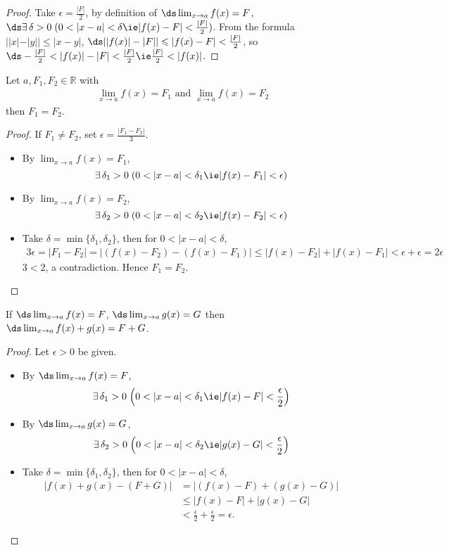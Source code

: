 \begin{proof}
  Take $\epsilon = \frac{|F|}{2}$, by definition of $\ds \lim_{x \to a} f(x) = F$, $\ds\exists\,\delta > 0\;(0 < |x - a| < \delta \ie  |f(x) - F| < \frac{|F|}{2})$. From the formula $||x| - |y|| \leqslant |x - y|$, $\ds||f(x)| - |F|| \leqslant |f(x) - F| < \frac{|F|}{2}$, so $\ds-\frac{|F|}{2} < |f(x)| - |F| < \frac{|F|}{2} \ie \frac{|F|}{2} < |f(x)|$.
\end{proof}
\begin{theorem}
  Let $a, F_1, F_2 \in \mathbb{R}$ with
  \begin{align*}
    \lim_{x \to a} f(x) = F_1 \text{ and }\lim_{x \to a} f(x) = F_2
  \end{align*}
  then $F_1 = F_2$.
\end{theorem}
\begin{proof}
  If $F_1\ne F_2$, set $\epsilon = \frac{|F_1 - F_2|}{3}$.
  \begin{itemize}
    \item By $\lim_{x\to a}f(x) = F_1$, $$\exists\,\delta_1 > 0\;(0 < |x - a| < \delta_1 \ie |f(x) - F_1| < \epsilon)$$
    \item By $\lim_{x\to a}f(x) = F_2$, $$\exists\,\delta_2 > 0\;(0 < |x - a| < \delta_2 \ie |f(x) - F_2| < \epsilon)$$
    \item Take $\delta = \min\{\delta_1, \delta_2\}$, then for $ 0 < |x - a| < \delta$,
      \begin{align*}
        3\epsilon = |F_1 - F_2| = |(f(x) - F_2) - (f(x) - F_1)| \leqslant |f(x) - F_2| + |f(x) - F_1| < \epsilon + \epsilon = 2\epsilon
      \end{align*}
      $3 < 2$, a contradiction. Hence $F_1 = F_2$.
  \end{itemize}
\end{proof}
\begin{theorem}
  If $\ds\lim_{x\to a}f(x) = F$, $\ds\lim_{x\to a}g(x) = G$ then $\ds\lim_{x\to a} f(x) + g(x) = F + G$.
\end{theorem}
\begin{proof}
  Let $\epsilon > 0$ be given.
  \begin{itemize}
    \item By $\ds\lim_{x\to a}f(x) = F$, $$\exists\,\delta_1 > 0\;\Big(0 < |x - a| < \delta_1\ie |f(x) - F| < \frac{\epsilon}{2}\Big)$$
    \item By $\ds\lim_{x\to a}g(x) = G$, $$\exists\,\delta_2 > 0\;\Big(0 < |x - a| < \delta_2\ie |g(x) - G| < \frac{\epsilon}{2}\Big)$$
    \item Take $\delta = \min\{\delta_1, \delta_2\}$, then for $ 0 < |x - a| < \delta$,
      \begin{align*}
        |f(x) + g(x) - (F + G)| &= |(f(x) - F) + (g(x) - G)| \\
        &\leqslant |f(x) - F| + |g(x) - G| \\
        &< \frac{\epsilon}{2} + \frac{\epsilon}{2} = \epsilon.
      \end{align*}
  \end{itemize}
\end{proof}
